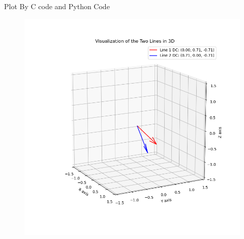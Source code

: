 \documentclass{beamer}
\begin{document}
\begin{frame}{Plot By C code and Python Code}
    \begin{figure}
    \centering
    \includegraphics[width=0.7\columnwidth]{figs/Figure_1.png}
    \label{fig:placeholder}
\end{figure}
\end{frame}
\end{document}
